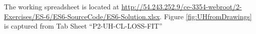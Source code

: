 \documentclass[12pt]{article}
\begin{document}
\begin{enumerate}
\begin{enumerate}[a)]
The working spreadsheet is located at \url{http://54.243.252.9/ce-3354-webroot/2-Exercises/ES-6/ES6-SourceCode/ES6-Solution.xlsx}. Figure \ref{fig:UHfromDrawings} is captured from Tab Sheet ``P2-UH-CL-LOSS-FIT''

\end{enumerate}
\end{enumerate}
\end{document}
